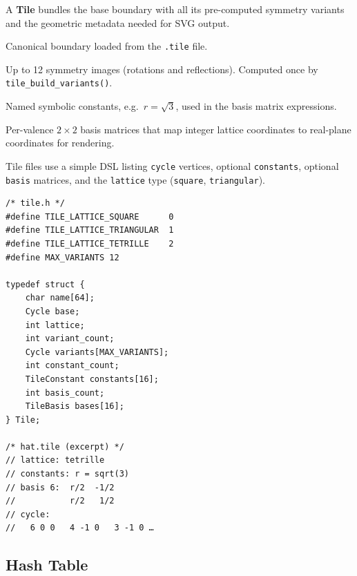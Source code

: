 \documentclass[10pt,a4paper]{article}
\let\polysubsection\subsection
\renewcommand\subsection{\needspace{0.12\textheight}\polysubsection}
\newcommand{\code}[1]{\texttt{\small #1}}
\newcommand{\file}[1]{\texttt{\footnotesize #1}}
\begin{document}
\begin{tcolorbox}[dualbox, title=Tile — \file{src/core/tile.h}]
  A \textbf{Tile} bundles the base boundary with all its pre-computed
  symmetry variants and the geometric metadata needed for SVG output.

  \begin{description}[leftmargin=0pt]
    \item[\code{base}] Canonical boundary loaded from the
      \file{.tile} file.
    \item[\code{variants}] Up to 12 symmetry images (rotations and
      reflections).  Computed once by \code{tile\_build\_variants()}.
    \item[\code{constants}] Named symbolic constants, e.g.\ $r =
      \sqrt{3}$, used in the basis matrix expressions.
    \item[\code{bases}] Per-valence $2{\times}2$ basis matrices that
      map integer lattice coordinates to real-plane coordinates for
      rendering.
  \end{description}

  Tile files use a simple DSL listing \code{cycle} vertices,
  optional \code{constants}, optional \code{basis} matrices,
  and the \code{lattice} type (\code{square}, \code{triangular}).
\tcblower
\begin{verbatim}
/* tile.h */
#define TILE_LATTICE_SQUARE      0
#define TILE_LATTICE_TRIANGULAR  1
#define TILE_LATTICE_TETRILLE    2
#define MAX_VARIANTS 12

typedef struct {
    char name[64];
    Cycle base;
    int lattice;
    int variant_count;
    Cycle variants[MAX_VARIANTS];
    int constant_count;
    TileConstant constants[16];
    int basis_count;
    TileBasis bases[16];
} Tile;

/* hat.tile (excerpt) */
// lattice: tetrille
// constants: r = sqrt(3)
// basis 6:  r/2  -1/2
//           r/2   1/2
// cycle:
//   6 0 0   4 -1 0   3 -1 0 …
\end{verbatim}
\end{tcolorbox}

\subsection{Hash Table}
\end{document}

